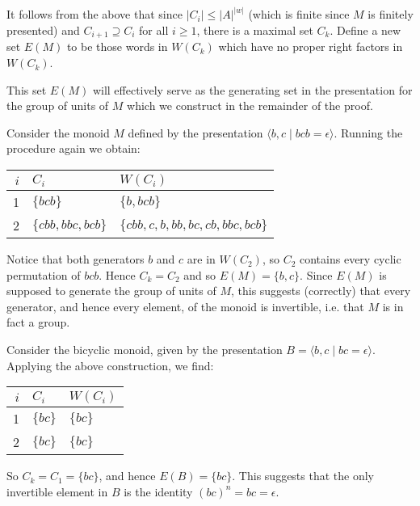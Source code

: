 \documentclass[noindex,noinsetproof,emphthm,12pt]{lmaths}
\begin{document}
It follows from the above that since $|C_i| \le |A|^{|w|}$ (which is finite since $M$ is finitely presented) and $C_{i+1} \supseteq C_i$ for all $i \ge 1$, there is a maximal set $C_k$. Define a new set $E(M)$ to be those words in $W(C_k)$ which have no proper right factors in $W(C_k)$.

This set $E(M)$ will effectively serve as the generating set in the presentation for the group of units of $M$ which we construct in the remainder of the proof.

\begin{example} \label{ex:Ck-group}
	Consider the monoid $M$ defined by the presentation $\langle b, c \mid bcb = \epsilon \rangle$. Running the procedure again we obtain:

	\begin{center}
	\renewcommand{\arraystretch}{1.2}
	\begin{tabular}{r|ll}
		$i$ & $C_i$ & $W(C_i)$ \\ \hline
		1 & $\{bcb\}$ & $\{b, bcb\}$ \\
		2 & $\{cbb, bbc, bcb\}$ & $\{cbb, c, b, bb, bc, cb, bbc, bcb\}$
	\end{tabular}
	\end{center}

	Notice that both generators $b$ and $c$ are in $W(C_2)$, so $C_2$ contains every cyclic permutation of $bcb$. Hence $C_k = C_2$ and so $E(M) = \{ b, c\}$. Since $E(M)$ is supposed to generate the group of units of $M$, this suggests (correctly) that every generator, and hence every element, of the monoid is invertible, i.e. that $M$ is in fact a group. 
\end{example}

\begin{example}
	Consider the bicyclic monoid, given by the presentation $B = \langle b, c \mid bc = \epsilon \rangle$.
	Applying the above construction, we find:

	\begin{center}
	\renewcommand{\arraystretch}{1.2}
	\begin{tabular}{r|ll}
		$i$ & $C_i$ & $W(C_i)$ \\ \hline
		1 & $\{bc\}$ & $\{bc\}$ \\
		2 & $\{bc\}$ & $\{bc\}$
	\end{tabular}
	\end{center}

	So $C_k = C_1 = \{ bc \}$, and hence $E(B) = \{bc\}$. This suggests that the only invertible element in $B$ is the identity $(bc)^n = bc = \epsilon$.
\end{example}
\end{document}
